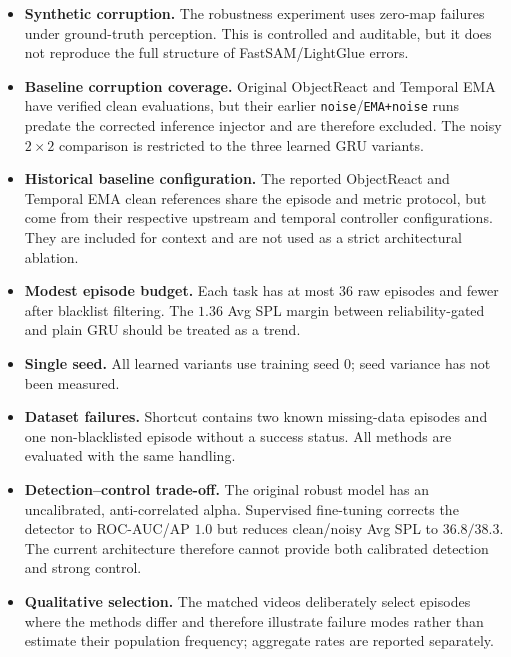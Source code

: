 \documentclass[conference]{IEEEtran}
\begin{document}
\begin{itemize}
\item \textbf{Synthetic corruption.} The robustness experiment uses zero-map failures under ground-truth perception. This is controlled and auditable, but it does not reproduce the full structure of FastSAM/LightGlue errors.
\item \textbf{Baseline corruption coverage.} Original ObjectReact and
Temporal EMA have verified clean evaluations, but their earlier
\texttt{noise}/\texttt{EMA+noise} runs predate the corrected inference
injector and are therefore excluded. The noisy $2{\times}2$ comparison is
restricted to the three learned GRU variants.
\item \textbf{Historical baseline configuration.} The reported ObjectReact
and Temporal EMA clean references share the episode and metric protocol, but
come from their respective upstream and temporal controller configurations.
They are included for context and are not used as a strict architectural
ablation.
\item \textbf{Modest episode budget.} Each task has at most 36 raw episodes and fewer after blacklist filtering. The $1.36$ Avg SPL margin between reliability-gated and plain GRU should be treated as a trend.
\item \textbf{Single seed.} All learned variants use training seed 0; seed variance has not been measured.
\item \textbf{Dataset failures.} Shortcut contains two known missing-data episodes and one non-blacklisted episode without a success status. All methods are evaluated with the same handling.
\item \textbf{Detection--control trade-off.} The original robust model has an uncalibrated, anti-correlated alpha. Supervised fine-tuning corrects the detector to ROC-AUC/AP $1.0$ but reduces clean/noisy Avg SPL to $36.8/38.3$. The current architecture therefore cannot provide both calibrated detection and strong control.
\item \textbf{Qualitative selection.} The matched videos deliberately select episodes where the methods differ and therefore illustrate failure modes rather than estimate their population frequency; aggregate rates are reported separately.
\end{itemize}
\end{document}

